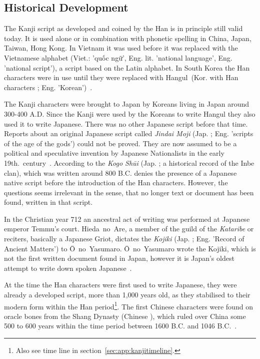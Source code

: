 \subsection{Historical Development}
\label{sec:historicaldevelopmentofjapanesescript}

The Kanji script as developed and coined by the Han is in principle still valid 
today. It is used alone or in combination with phonetic spelling in China, Japan,
Taiwan, Hong Kong. In Vietnam it was used before it was replaced with the 
Vietnamese alphabet (Viet.: 'quốc ngữ', Eng. lit. 'national language', Eng. 
'national script'), a script based on the Latin alphabet. In South Korea the Han 
characters were in use until they were replaced with 
Hangul~(Kor. with Han characters ; Eng. 'Korean')~.

The Kanji characters were brought to Japan by Koreans living in Japan around 
300-400 A.D. Since the Kanji were used by the Koreans to write 
Hangul they also used it to write Japanese. There was no other Japanese script 
before that time. Reports about an original Japanese script called 
\emph{Jindai Moji} (Jap. ; Eng. 'scripts of the age of the gods')
could not be proved. They are now assumed to be a political and speculative 
invention by Japanese Nationalists in the early 
19th.~century~. According to 
the \emph{Kogo Shūi} (Jap. ; a historical record of the Inbe clan),
which was written around 800 B.C. denies the presence of a Japanese native
script before the introduction of the Han characters. However, the questions
seems irrelevant in the sense, that no longer text or document has been found,
written in that script.

In the Christian year 712 an ancestral act of writing was performed at 
Japanese emperor Temmu's court. Hieda~no~Are, a member of the guild of the 
\emph{Kataribe} or reciters, basically a Japanese Griot, dictates the 
\emph{Kojiki} (Jap. ; Eng. 'Record of Ancient Matters') to 
Ō~no~Yasumaro. Ō~no~Yasumaro wrote the Kojiki, which is not the first written 
document found in Japan, however it is Japan's oldest attempt to write down 
spoken Japanese~.

At the time the Han characters were first used to write Japanese, 
they were already a developed script, more than 1,000 years old, 
as they stabilised to their modern form within the Han 
period\footnote{Also see time line in section~\ref{sec:app:kanjitimeline}.}.
The first Chinese characters were found on oracle bones from the Shang Dynasty
(Chinese ), which ruled over China some 500 to 600 years within the 
time period between 1600 B.C. and 1046 B.C.~.

